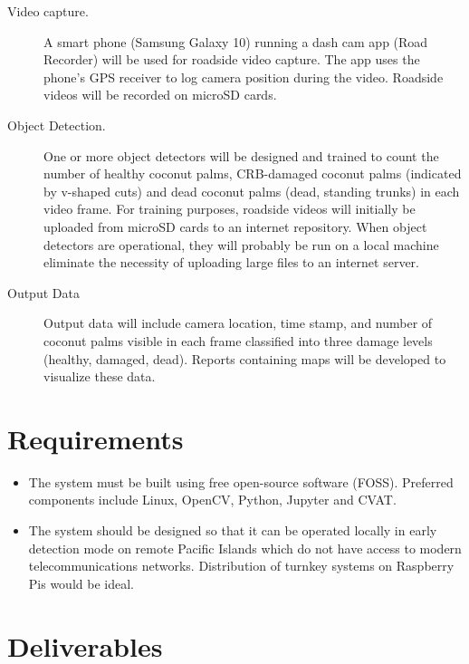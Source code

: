 \documentclass[12pt,letterpaper,english,bibliography=totocnumbered, abstract=on]{scrartcl}
\begin{document}
\begin{description}
	
	\item[Video capture.] A smart phone (Samsung Galaxy 10) running a dash cam app (Road Recorder) will be used for roadside video capture. The app uses the phone's GPS receiver to log camera position during the video. Roadside videos will be recorded on microSD cards.
	
	\item[Object Detection.] One or more object detectors will be designed and trained to count the number of healthy coconut palms, CRB-damaged coconut palms (indicated by v-shaped cuts) and dead coconut palms (dead, standing trunks) in each video frame.	
	For training purposes, roadside videos will initially be uploaded from microSD cards to an internet repository. When object detectors are operational, they will probably be run on a local machine eliminate the necessity of uploading large files to an internet server. 
	
	\item[Output Data] Output data will include camera location, time stamp, and number of coconut palms visible in each frame classified into three damage levels (healthy, damaged, dead). Reports containing maps will be developed to visualize these data.
	
\end{description}

\section{Requirements}

\begin{itemize}
	
	\item The system must be built using free open-source software (FOSS).  Preferred components include Linux, OpenCV, Python, Jupyter and CVAT.
	
	\item The system should be designed so that it can be operated locally in early detection mode on remote Pacific Islands which do not have access to modern telecommunications networks. Distribution of turnkey systems on Raspberry Pis would be ideal. 
	
\end{itemize}

\section{Deliverables}
\end{document}
